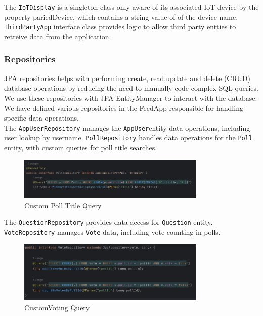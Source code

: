\noindent The \texttt{IoTDisplay} is a singleton class only aware of its associated IoT device by the property pariedDevice, which contains a string value of of the device name. \\

\noindent \texttt{ThirdPartyApp} interface class provides logic to allow third party entties to retreive data from the application. \\


\subsubsection{Repositories}
JPA repositories helps with performing create, read,update and delete (CRUD) database operations by reducing the need to manually code complex SQL queries.  We use these repositories with JPA EntityManager to interact with the database. We have defined various repositories in the FeedApp responsible for handling specific data operations.\\

\noindent The \texttt{AppUserRepository} manages the \texttt{AppUser}entity data operations, including user lookup by username.
\noindent \texttt{PollRepository} handles data operations for the \texttt{Poll} entity, with custom queries for poll title searches.\\

\begin{figure}[h]
  \centering
  \includegraphics[width=0.80\textwidth]{figs/poll_repository.png}
  \caption{Custom Poll Title Query}
  \label{fig:my_label}
\end{figure}

\noindent The \texttt{QuestionRepository} provides data access for \texttt{Question} entity.
\noindent \texttt {VoteRepository} manages \texttt{Vote} data, including vote counting in polls.

\begin{figure}[h]
  \centering
  \includegraphics[width=0.80\textwidth]{figs/vote_repository.png}
  \caption{CustomVoting Query}
  \label{fig:my_label}
\end{figure}


